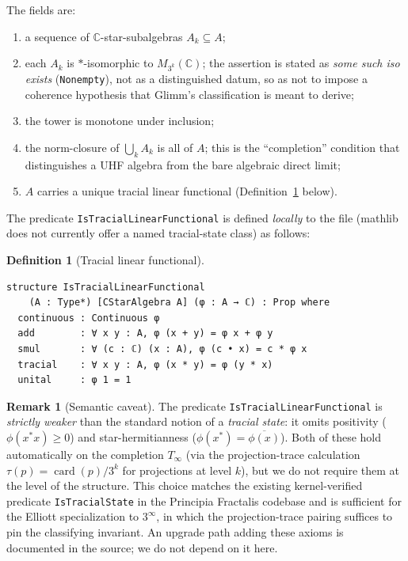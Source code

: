 \documentclass[11pt,a4paper]{article}
\theoremstyle{plain}
\theoremstyle{definition}
\newtheorem{definition}[theorem]{Definition}
\newtheorem{remark}[theorem]{Remark}
\begin{document}
\noindent
The fields are:
\begin{enumerate}[leftmargin=2em]
  \item[\texttt{tower}:] a sequence of $\mathbb{C}$-star-subalgebras $A_k \subseteq A$;
  \item[\texttt{tower\_matrix}:] each $A_k$ is $\ast$-isomorphic to $M_{3^k}(\mathbb{C})$; the assertion is stated as \emph{some such iso exists} (\texttt{Nonempty}), not as a distinguished datum, so as not to impose a coherence hypothesis that Glimm's classification is meant to derive;
  \item[\texttt{tower\_mono}:] the tower is monotone under inclusion;
  \item[\texttt{tower\_dense}:] the norm-closure of $\bigcup_k A_k$ is all of $A$; this is the ``completion'' condition that distinguishes a UHF algebra from the bare algebraic direct limit;
  \item[\texttt{trace\_unique}:] $A$ carries a unique tracial linear functional (Definition~\ref{def:tracial-linear} below).
\end{enumerate}

The predicate \texttt{IsTracialLinearFunctional} is defined \emph{locally} to the file (mathlib does not currently offer a named tracial-state class) as follows:

\begin{definition}[Tracial linear functional]
\label{def:tracial-linear}
\begin{lstlisting}
structure IsTracialLinearFunctional
    (A : Type*) [CStarAlgebra A] (φ : A → ℂ) : Prop where
  continuous : Continuous φ
  add        : ∀ x y : A, φ (x + y) = φ x + φ y
  smul       : ∀ (c : ℂ) (x : A), φ (c • x) = c * φ x
  tracial    : ∀ x y : A, φ (x * y) = φ (y * x)
  unital     : φ 1 = 1
\end{lstlisting}
\end{definition}

\begin{remark}[Semantic caveat]
\label{rem:tracial-caveat}
The predicate \texttt{IsTracialLinearFunctional} is \emph{strictly weaker} than the standard notion of a \emph{tracial state}: it omits positivity ($\phi(x^{\ast} x) \geq 0$) and star-hermitianness ($\phi(x^{\ast}) = \overline{\phi(x)}$). Both of these hold automatically on the completion $T_{\infty}$ (via the projection-trace calculation $\tau(p) = \operatorname{card}(p)/3^k$ for projections at level $k$), but we do not require them at the level of the structure. This choice matches the existing kernel-verified predicate \texttt{IsTracialState} in the Principia Fractalis codebase and is sufficient for the Elliott specialization to $3^{\infty}$, in which the projection-trace pairing suffices to pin the classifying invariant. An upgrade path adding these axioms is documented in the source; we do not depend on it here.
\end{remark}
\end{document}
